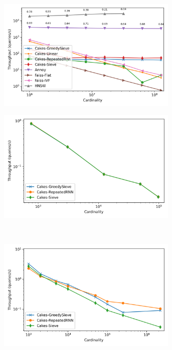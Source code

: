 \begin{figure}
\begin{subfigure}[b]{0.47\textwidth}
\label{fig:results:glove-25-scaling}
\end{subfigure}%
\vspace{1em}
\\
\begin{subfigure}[b]{0.47\textwidth}
\includegraphics[width=0.95\textwidth]{plots/sift-knn-10.png}
\label{fig:results:sift-scaling}
\end{subfigure}%
\begin{subfigure}[b]{0.47\textwidth}
\includegraphics[width=0.95\textwidth]{plots/radio-ml-knn-10.png}
\label{fig:results:radioml-scaling}
\end{subfigure}%
\vspace{1em}
\\
\begin{subfigure}[b]{0.47\textwidth}
\includegraphics[width=0.95\textwidth]{plots/silva-knn-10.png}

\end{subfigure}
\end{figure}
